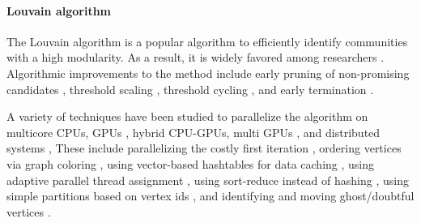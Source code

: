 \paragraph{Louvain algorithm \cite{com-blondel08}}

The Louvain algorithm is a popular algorithm to efficiently identify communities with a high modularity. As a result, it is widely favored among researchers \cite{com-lancichinetti09}. Algorithmic improvements to the \Lou{} method include early pruning of non-promising candidates \cite{com-halappanavar17}, threshold scaling \cite{com-naim17, com-halappanavar17}, threshold cycling \cite{com-ghosh18}, and early termination \cite{com-ghosh18}.

A variety  of techniques have been studied to parallelize the \Lou{} algorithm on multicore CPUs, GPUs \cite{com-cheong13}, hybrid CPU-GPUs, multi GPUs \cite{com-cheong13, com-bhowmick22}, and distributed systems \cite{com-bhowmick22}, These include parallelizing the costly first iteration \cite{com-wickramaarachchi14}, ordering vertices via graph coloring \cite{com-halappanavar17}, using vector-based hashtables for data caching \cite{com-halappanavar17}, using adaptive parallel thread assignment \cite{com-naim17}, using sort-reduce instead of hashing \cite{com-cheong13}, using simple partitions based on vertex ids \cite{com-cheong13, com-ghosh18}, and identifying and moving ghost/doubtful vertices \cite{com-bhowmick22}.

